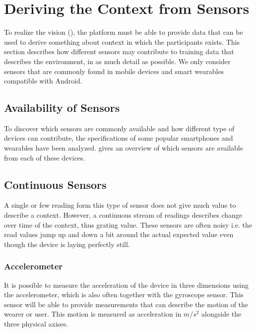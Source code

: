 
\section{Deriving the Context from Sensors}
\label{sec:deriving_the_context_from_sensors}

To realize the vision (), the platform must be able to provide data that can be used to derive something about context in which the participants exists. This section describes how different sensors may contribute to training data that describes the environment, in as much detail as possible. We only consider sensors that are commonly found in mobile devices and smart wearables compatible with Android. 

\subsection{Availability of Sensors}
To discover which sensors are commonly available and how different type of devices can contribute, the specifications of some popular smartphones and wearables have been analyzed.  gives an overview of which sensors are available from each of these devices. 



\subsection{Continuous Sensors}
A single or few reading form this type of sensor does not give much value to describe a context. However, a continuous stream of readings describes change over time of the context, thus grating value. These sensors are often noisy i.e. the read values jump up and down a bit around the actual expected value even though the device is laying perfectly still.

\subsubsection{Accelerometer}
It is possible to measure the acceleration of the device in three dimensions using the accelerometer, which is also often together with the gyroscope sensor. This sensor will be able to provide measurements that can describe the motion of the wearer or user. This motion is measured as acceleration in $m/s^2$ alongside the three physical axises.

